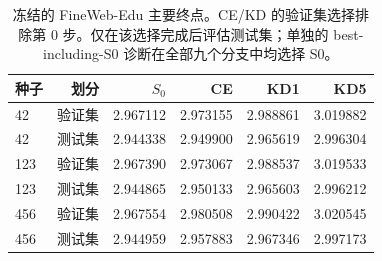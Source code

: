 \begin{table}[!t]\centering
\begin{tabular}{lrrrrr}
\toprule
种子 & 划分 & $S_0$ & CE & KD1 & KD5 \\
\midrule
42 & 验证集 & 2.967112 & 2.973155 & 2.988861 & 3.019882 \\
42 & 测试集 & 2.944338 & 2.949900 & 2.965619 & 2.996304 \\
123 & 验证集 & 2.967390 & 2.973067 & 2.988537 & 3.019533 \\
123 & 测试集 & 2.944865 & 2.950133 & 2.965603 & 2.996212 \\
456 & 验证集 & 2.967554 & 2.980508 & 2.990422 & 3.020545 \\
456 & 测试集 & 2.944959 & 2.957883 & 2.967346 & 2.997173 \\
\bottomrule
\end{tabular}
\caption{冻结的 FineWeb-Edu 主要终点。CE/KD 的验证集选择排除第 0 步。仅在该选择完成后评估测试集；单独的 best-including-S0 诊断在全部九个分支中均选择 S0。}\label{tab:modern_endpoints}
\end{table}
